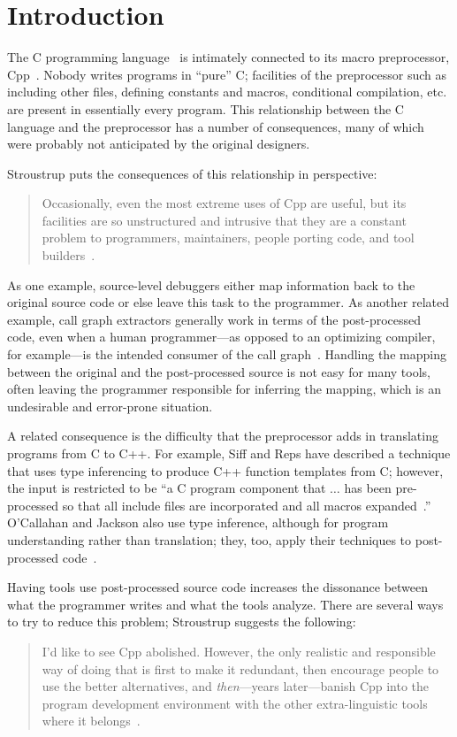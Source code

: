 \bigskip

\section{Introduction}

The C programming language~\cite{ansi} is intimately connected to its
macro preprocessor, Cpp~\cite[Ch.3]{Harbison91}.  Nobody writes
programs in ``pure'' C; facilities of the preprocessor such as
including other files, defining constants and macros, conditional
compilation, etc. are present in essentially every program.  This
relationship between the C language and the preprocessor has a number
of consequences, many of which were probably not anticipated by the
original designers.

Stroustrup puts the consequences of this relationship in perspective:
\begin{quote}
Occasionally, even the most extreme uses of Cpp are useful, but its
facilities are so unstructured and intrusive that they are a constant
problem to programmers, maintainers, people porting code, and tool
builders~\cite[p.~424]{Stroustrup-DesignEvolution}.
\end{quote}

As one example, source-level debuggers either map information back to
the original source code or else leave this task to the programmer.
As another related example, call graph extractors generally work in
terms of the post-processed code, even when a human programmer---as
opposed to an optimizing compiler, for example---is the intended
consumer of the call graph~\cite{Murphy-icse18}.  Handling the mapping
between the original and the post-processed source is not easy for
many tools, often leaving the programmer responsible for inferring the
mapping, which is an undesirable and error-prone situation.

A related consequence is the difficulty that the preprocessor adds in
translating programs from C to C++.  For example, Siff and Reps have
described a technique that uses type inferencing to produce C++
function templates from C; however, the input is restricted to be ``a
C program component that $\ldots$ has been pre-processed so that all
include files are incorporated and all macros
expanded~\cite[p.~145]{Siff-fse96}.''  O'Callahan and Jackson also use
type inference, although for program understanding rather than
translation; they, too, apply their techniques to post-processed
code~\cite{OCallahan-icse97}.

Having tools use post-processed source code increases the dissonance
between what the programmer writes and what the tools analyze.  There
are several ways to try to reduce this problem; Stroustrup suggests
the following:
\begin{quote}
I'd like to see Cpp abolished.  However, the only realistic and
responsible way of doing that is first to make it redundant, then
encourage people to use the better alternatives, and {\em
then\/}---years later---banish Cpp into the program development
environment with the other extra-linguistic tools where it
belongs~\cite[p.~426]{Stroustrup-DesignEvolution}.
\end{quote}

